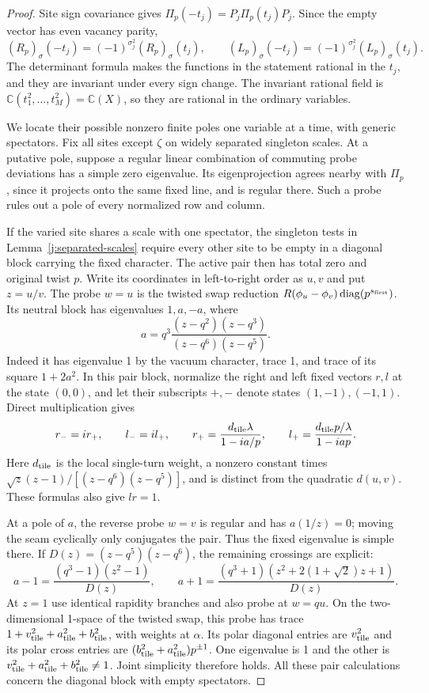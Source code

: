 \begin{proof}
Site sign covariance gives
$\Pi_p(-t_j)=P_j\Pi_p(t_j)P_j$. Since the empty vector has even
vacancy parity,
\[
(R_p)_\sigma(-t_j)=(-1)^{\sigma_j^2}(R_p)_\sigma(t_j),\qquad
(L_p)_\sigma(-t_j)=(-1)^{\sigma_j^2}(L_p)_\sigma(t_j).
\]
The determinant formula makes the functions in the statement rational
in the $t_j$, and they are invariant under every sign change. The
invariant rational field is
$\mathbb C(t_1^2,\ldots,t_M^2)=\mathbb C(X)$, so they are rational in
the ordinary variables.

We locate their possible nonzero finite poles one variable at a time,
with generic spectators. Fix all sites except $\zeta$ on widely
separated singleton scales. At a putative pole, suppose a regular
linear combination of commuting probe deviations has a simple zero
eigenvalue. Its eigenprojection agrees nearby with $\Pi_p$, since it
projects onto the same fixed line, and is regular there. Such a probe
rules out a pole of every normalized row and column.

If the varied site shares a scale with one spectator, the singleton
tests in Lemma~\ref{j:separated-scales} require every other site to
be empty in a diagonal block carrying the fixed character. The active
pair then has total zero and original twist $p$. Write its coordinates
in left-to-right order as $u,v$ and put $z=u/v$. The probe $w=u$ is
the twisted swap reduction
$R(\phi_u-\phi_v)\operatorname{diag}(p^{s_{\rm first}})$. Its neutral
block has eigenvalues $1,a,-a$, where
\[
a=q^3\frac{(z-q^2)(z-q^3)}{(z-q^6)(z-q^5)}.
\]
Indeed it has eigenvalue 1 by the vacuum character, trace 1, and
trace of its square $1+2a^2$. In this pair block, normalize the
right and left fixed vectors $r,l$ at the state $(0,0)$, and let their
subscripts $+,-$ denote states $(1,-1),(-1,1)$. Direct multiplication
gives
\[
r_-=ir_+,\qquad l_-=il_+,\qquad
r_+=\frac{d_{\rm tile}\lambda}{1-ia/p},\qquad
l_+=\frac{d_{\rm tile}p/\lambda}{1-iap}.
\]
Here $d_{\rm tile}$ is the local single-turn weight, a nonzero constant
times $\sqrt z(z-1)/[(z-q^6)(z-q^5)]$, and is distinct from the
quadratic $d(u,v)$. These formulas also give $lr=1$.

At a pole of $a$, the reverse probe $w=v$ is regular and has
$a(1/z)=0$; moving the seam cyclically only conjugates the pair.
Thus the fixed eigenvalue is simple there. If
$D(z)=(z-q^5)(z-q^6)$, the remaining crossings are explicit:
\[
a-1=\frac{(q^3-1)(z^2-1)}{D(z)},\qquad
a+1=\frac{(q^3+1)(z^2+2(1+\sqrt2)z+1)}{D(z)}.
\]
At $z=1$ use identical rapidity branches and also probe at $w=qu$.
On the two-dimensional 1-space of the twisted swap, this probe has
trace $1+v_{\rm tile}^2+a_{\rm tile}^2+b_{\rm tile}^2$, with weights
at $\alpha$. Its polar diagonal entries are $v_{\rm tile}^2$ and
its polar cross entries are $(b_{\rm tile}^2+a_{\rm tile}^2)p^{\pm1}$.
One eigenvalue is 1 and the other is
$v_{\rm tile}^2+a_{\rm tile}^2+b_{\rm tile}^2\ne1$. Joint simplicity
therefore holds. All these pair calculations concern the diagonal
block with empty spectators.


\end{proof}
